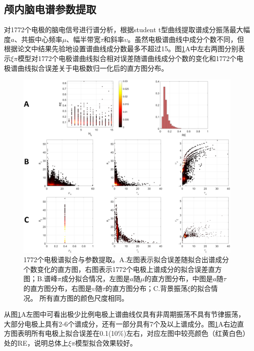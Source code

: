 \subsection{颅内脑电谱参数提取}
对1772个电极的脑电信号进行谱分析，根据student t型曲线提取谱成分振荡最大幅度$a$、共振中心频率$\mu$、幅半带宽$\tau$和斜率$\upsilon$。虽然电极谱曲线中成分个数不同，但根据论文中结果先验地设置谱曲线成分数最多不超过15。图\ref{7:para}A中左右两图分别表示$\xi\pi$模型对1772个电极谱曲线拟合相对误差随谱曲线成分个数的变化和1772个电极谱曲线拟合误差关于电极数归一化后的直方图分布。
\begin{figure}[!h]
\includegraphics[width=15cm]{pic/xipi/para.png}
\caption{1772个电极谱拟合与参数提取。A.左图表示拟合误差随拟合出谱成分个数变化的直方图，右图表示1772个电极上谱成分的拟合误差直方图；B.谱峰$\pi$成分拟合情况，左图是$a$随$\mu$的直方图分布，中图是$a$随$\tau$的直方图分布，右图是$\upsilon$随$\tau$的直方图分布；C.背景振荡$\xi$的拟合情况。 所有直方图的颜色尺度相同。}
\label{7:para}
\end{figure}
从图\ref{7:para}A左图中可看出极少比例电极上谱曲线仅具有非周期振荡不具有节律振荡，大部分电极上具有2-6个谱成分，还有一部分具有7个及以上谱成分。图\ref{7:para}A右边直方图表明所有电极上拟合误差在0.1(10\%)左右，对应左图中较亮颜色（红黄白色）处的RE，说明总体上$\xi\pi$模型拟合效果较好。

